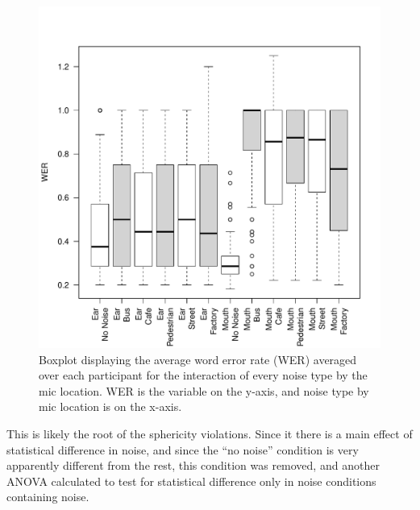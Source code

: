 \documentclass[dissertation,copyright]{uathesis}
\makeatletter
\def\maxwidth{ %
  \ifdim\Gin@nat@width>\linewidth
    \linewidth
  \else
    \Gin@nat@width
  \fi
}
\makeatother
\begin{document}
\begin{figure}

\includegraphics[width=\maxwidth]{figure/boxplot_noiseXmic-1} 

\caption{Boxplot displaying the average word error rate (WER) averaged over each participant for the interaction of every noise type by the mic location. WER is the variable on the y-axis, and noise type by mic location is on the x-axis.}
\label{fig:anova1_noiseXmic_boxplot}
\end{figure}

This is likely the root of the sphericity violations.  Since it there is a main effect of statistical difference in noise, and since the ``no noise'' condition is very apparently different from the rest, this condition was removed, and another ANOVA calculated to test for statistical difference only in noise conditions containing noise. 
\end{document}
